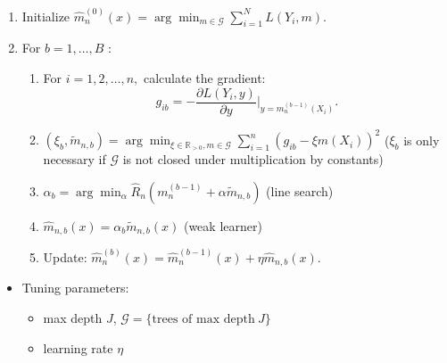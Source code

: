 \documentclass[
]{book}
\providecommand{\tightlist}{%
  \setlength{\itemsep}{0pt}\setlength{\parskip}{0pt}}
\begin{document}
\begin{enumerate}
\def\labelenumi{\arabic{enumi}.}
\tightlist
\item
  Initialize \(\hat m_{n}^{(0)}(x)=\arg \min_{m \in \mathcal G} \sum_{i=1}^N L\left(Y_i, m\right)\).
\item
  For \(b=1,\dots,B\) :

  \begin{enumerate}
  \def\labelenumii{(\alph{enumii})}
  \tightlist
  \item
    For \(i=1,2, \ldots, n,\) calculate the gradient:
    \[
    g_{ib}=-\frac{\partial L(Y_i,y)}{\partial y} \Bigr\rvert_{y=m_n^{(b-1)}(X_i)} .
    \]
  \item
    \((\xi_b, \tilde m_{n,b})= \arg \min_{\xi\in \mathbb R_{>0},m \in \mathcal G}\sum_{i=1}^n(g_{ib}-\xi m(X_i))^2\) (\(\xi_b\) is only necessary if \(\mathcal G\) is not closed under multiplication by constants)
  \item
    \(\alpha_b= \arg \min_{\alpha} \hat R_n(m_n^{(b-1)}+\alpha \tilde m_{n,b})\) (line search)
  \item
    \(\hat m_{n,b}(x)= \alpha_b \tilde m_{n,b}(x)\) (weak learner)
  \item
    Update: \(\hat m^{(b)}_n(x)=\hat m^{(b-1)}_n(x)+\eta \hat m_{n,b}(x)\).
  \end{enumerate}
\end{enumerate}

\begin{itemize}
\tightlist
\item
  Tuning parameters:

  \begin{itemize}
  \tightlist
  \item
    max depth \(J\), \(\mathcal G=\{\text{trees of max depth} \ J\}\)
  \item
    learning rate \(\eta\)
  \end{itemize}
\end{itemize}
\end{document}
